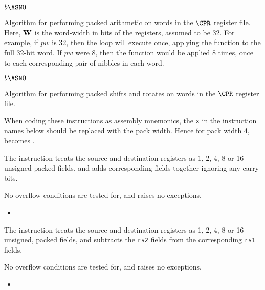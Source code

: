 \medskip

\begin{algorithm}
    $b   \ASN 0 $\;
\caption{Algorithm for performing packed arithmetic on words in the 
$\CPR$ register file. Here, ${\bf W}$ is the word-width in bits of the
registers, assumed to be $32$. For example, if $pw$ is 32, then the loop
will execute once, applying the function to the full 32-bit word. If $pw$
were $8$, then the function would be applied $8$ times, once to each
corresponding pair of nibbles in each word.}
\end{algorithm}

\begin{algorithm}
    $b   \ASN 0 $\;
\caption{Algorithm for performing packed shifts and rotates on words in the 
$\CPR$ register file.}
\end{algorithm}

When coding these instructions as assembly mnemonics, the {\tt x} in the
instruction names below should be replaced with the pack width. Hence
for pack width 4,  becomes .

{\iencaddpx}
{
The instruction  treats the source and destination registers as
1, 2, 4, 8 or 16 unsigned packed fields, and adds corresponding fields
together ignoring any carry bits.

No overflow conditions are tested for, and  raises no exceptions.
}{
\begin{itemize}
\item {}
\end{itemize}
}{}


{\iencsubpx}
{
The instruction  treats the source and destination registers as
1, 2, 4, 8 or 16 unsigned, packed fields, and subtracts the {\tt rs2} fields
from the corresponding {\tt rs1} fields.

No overflow conditions are tested for, and  raises no exceptions.
}{
\begin{itemize}
\item {}
\end{itemize}
}{}


